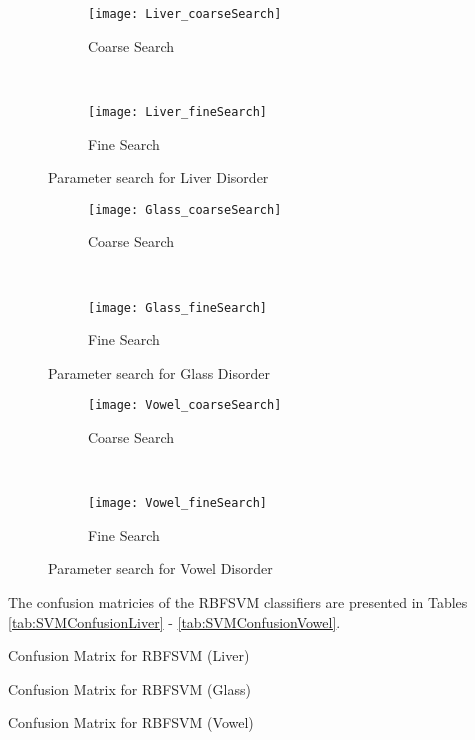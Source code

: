 \begin{figure*}[!ht]
	\centering
	\begin{subfigure}[b]{0.43\textwidth}
		\centering
		\texttt{[image: Liver\_coarseSearch]}
        \caption{Coarse Search}
	\end{subfigure}%
	~
	\begin{subfigure}[b]{0.43\textwidth}
		\centering
		\texttt{[image: Liver\_fineSearch]}
        \caption{Fine Search}
	\end{subfigure}	
	\caption{Parameter search for Liver Disorder}
	\label{fig:ParamLiver}

	\begin{subfigure}[b]{0.43\textwidth}
		\centering
		\texttt{[image: Glass\_coarseSearch]}
        \caption{Coarse Search}
	\end{subfigure}%
	~
	\begin{subfigure}[b]{0.43\textwidth}
		\centering
		\texttt{[image: Glass\_fineSearch]}
        \caption{Fine Search}
	\end{subfigure}	
	\caption{Parameter search for Glass Disorder}
	\label{fig:ParamGlass}

	\begin{subfigure}[b]{0.43\textwidth}
		\centering
		\texttt{[image: Vowel\_coarseSearch]}
        \caption{Coarse Search}
	\end{subfigure}%
	~
	\begin{subfigure}[b]{0.43\textwidth}
		\centering
		\texttt{[image: Vowel\_fineSearch]}
        \caption{Fine Search}
	\end{subfigure}	
	\caption{Parameter search for Vowel Disorder}
	\label{fig:ParamVowel}
\end{figure*}

The confusion matricies of the RBFSVM classifiers are presented in Tables \ref{tab:SVMConfusionLiver} - \ref{tab:SVMConfusionVowel}.  
\begin{table}[h!]
\caption{Confusion Matrix for RBFSVM (Liver)}
\label{tab:SVMConfusionLiver}
\centering

\end{table}
\begin{table}[h!]
\caption{Confusion Matrix for RBFSVM (Glass)}
\label{tab:SVMConfusionGlass}
\centering

\end{table}
\begin{table}[h!]
\caption{Confusion Matrix for RBFSVM (Vowel)}
\label{tab:SVMConfusionVowel}
\centering

\end{table}

